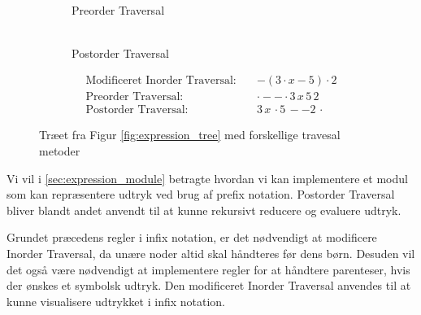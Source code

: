 \begin{figure}[H]
\begin{subfigure}{0.3\textwidth}
    \caption{\\Preorder Traversal}
  \end{subfigure}
  \hfill
  \begin{subfigure}{0.3\textwidth}
    \centering
    \caption{\\Postorder Traversal}
  \end{subfigure}
  \begin{align*}
      \text{Modificeret Inorder Traversal:} \quad & - (3 \cdot x - 5) \cdot 2 \\
      \text{Preorder Traversal:} \quad &  \cdot - - \cdot 3\, x\, 5\, 2  \\
      \text{Postorder Traversal:} \quad & 3\, x\, \cdot 5\, - -  2\, \cdot
  \end{align*}
  \caption{Træet fra Figur \ref{fig:expression_tree} med forskellige travesal metoder}
  \label{fig:expression_tree_traversal}
\end{figure}


Vi vil i \ref{sec:expression_module} betragte hvordan vi kan implementere et modul som kan repræsentere udtryk ved brug af prefix notation.
Postorder Traversal bliver blandt andet anvendt til at kunne rekursivt reducere og evaluere udtryk.

Grundet præcedens regler i infix notation, er det nødvendigt at modificere Inorder Traversal, da unære noder altid skal håndteres før dens børn. Desuden vil det også være nødvendigt at implementere regler for at håndtere parenteser, hvis der ønskes et symbolsk udtryk. Den modificeret Inorder Traversal anvendes til at kunne visualisere udtrykket i infix notation.


